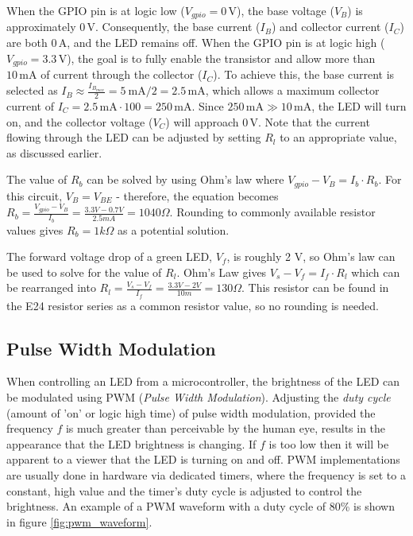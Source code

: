\documentclass[main.tex]{subfiles}
\begin{document}
\noindent When the GPIO pin is at logic low (\( V_{gpio} = 0\,\text{V} \)), the base voltage (\( V_B \)) is approximately \( 0\,\text{V} \). Consequently, the base current (\( I_B \)) and collector current (\( I_C \)) are both \( 0\,\text{A} \), and the LED remains off. When the GPIO pin is at logic high (\( V_{gpio} = 3.3\,\text{V} \)), the goal is to fully enable the transistor and allow more than \( 10\,\text{mA} \) of current through the collector (\( I_C \)). To achieve this, the base current is selected as \( I_B \approx \frac{I_{B_{max}}}{2} = 5 \ \text{mA}/2 = 2.5\,\text{mA} \), which allows a maximum collector current of \( I_C = 2.5\,\text{mA} \cdot 100 = 250\,\text{mA} \). Since \( 250\,\text{mA} \gg 10\,\text{mA} \), the LED will turn on, and the collector voltage (\( V_C \)) will approach \( 0\,\text{V} \). Note that the current flowing through the LED can be adjusted by setting \( R_l \) to an appropriate value, as discussed earlier. \newline

\newnoindentpara The value of $R_b$ can be solved by using Ohm's law where $V_{gpio} - V_B = I_b \cdot R_b$. For this circuit, $V_B = V_{BE}$ - therefore, the equation becomes $R_b = \frac{V_{gpio} - V_B}{I_b} = \frac{3.3V-0.7V}{2.5mA} = 1040 \Omega$. Rounding to commonly available resistor values gives  $R_b = 1 k \Omega$ as a potential solution. \newline

\newnoindentpara The forward voltage drop of a green LED, $V_f$, is roughly 2 V, so Ohm's law can be used to solve for the value of $R_l$. Ohm's Law gives $V_s - V_f = I_f \cdot R_l$ which can be rearranged into $R_l = \frac{V_s - V_f}{I_f} = \frac{3.3V-2V}{10m} = 130 \Omega$. This resistor can be found in the E24 resistor series as a common resistor value, so no rounding is needed. 

\subsection{Pulse Width Modulation}
When controlling an LED from a microcontroller, the brightness of the LED can be modulated using PWM (\textit{Pulse Width Modulation}). Adjusting the \textit{duty cycle} (amount of 'on' or logic high time) of pulse width modulation, provided the frequency $f$ is much greater than perceivable by the human eye, results in the appearance that the LED brightness is changing. If $f$ is too low then it will be apparent to a viewer that the LED is turning on and off. PWM implementations are usually done in hardware via dedicated timers, where the frequency is set to a constant, high value and the timer's duty cycle is adjusted to control the brightness. An example of a PWM waveform with a duty cycle of 80\% is shown in figure \ref{fig:pwm_waveform}.
\end{document}
